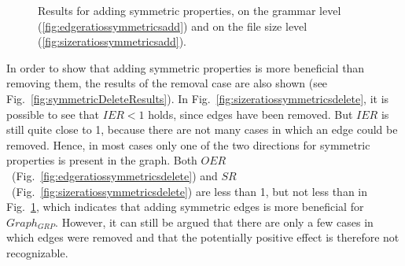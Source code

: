 \begin{figure}[h]
	\centering
	\hfill 
	\caption{Results for adding symmetric properties, on the grammar level (\ref{fig:edgeratiossymmetricsadd}) and on the file size level (\ref{fig:sizeratiossymmetricsadd}).}
	\label{fig:symmetricAddResults}
\end{figure}

In order to show that adding symmetric properties is more beneficial than removing them, the results of the removal case are also shown (see Fig.~\ref{fig:symmetricDeleteResults}). In Fig.~\ref{fig:sizeratiossymmetricsdelete}, it is possible to see that $IER<1$ holds, since edges have been removed. But $IER$ is still quite close to 1, because there are not many cases in which an edge could be removed. Hence, in most cases only one of the two directions for symmetric properties is present in the graph. Both $OER$~(Fig.~\ref{fig:edgeratiossymmetricsdelete}) and $SR$~(Fig.~\ref{fig:sizeratiossymmetricsdelete}) are less than 1, but not less than in Fig.~\ref{fig:symmetricAddResults}, which indicates that adding symmetric edges is more beneficial for $Graph_{GRP}$. However, it can still be argued that there are only a few cases in which edges were removed and that the potentially positive effect is therefore not recognizable.

